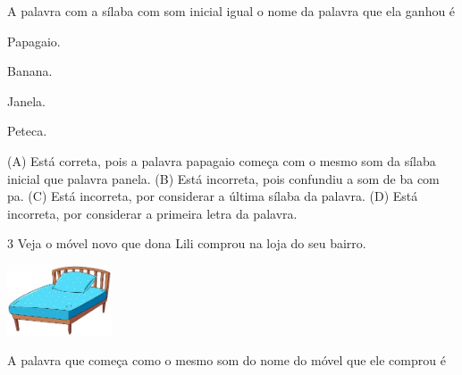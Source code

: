 
A palavra com a sílaba com som inicial igual o nome da palavra que ela ganhou é

\begin{minipage}{.5\textwidth}
\begin{escolha}
\item Papagaio.

\item Banana.

\item Janela.

\item Peteca.
\end{escolha}
\end{minipage}

(A) Está correta, pois a palavra papagaio começa com o mesmo som da
sílaba inicial que palavra panela.
(B) Está incorreta, pois confundiu a som de ba com pa.
(C) Está incorreta, por considerar a última sílaba da palavra.
(D) Está incorreta, por considerar a primeira letra da palavra.

\num{3} Veja o móvel novo que dona Lili comprou na loja do seu bairro.

\includegraphics[width=1.22293in,height=0.81839in]{media/image140.jpeg}


A palavra que começa como o mesmo som do nome do móvel que ele comprou é

